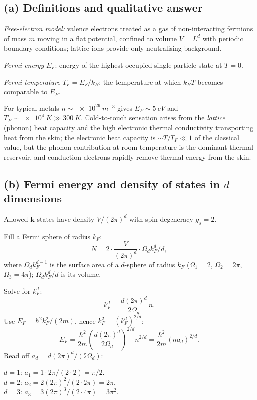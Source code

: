 \documentclass[11pt]{article}
\begin{document}
\subsection*{(a) Definitions and qualitative answer}

\emph{Free-electron model:} valence electrons treated as a gas of non-interacting fermions of mass $m$ moving in a flat potential, confined to volume $V=L^d$ with periodic boundary conditions; lattice ions provide only neutralising background.

\emph{Fermi energy} $E_F$: energy of the highest occupied single-particle state at $T=0$.

\emph{Fermi temperature} $T_F = E_F/k_B$: the temperature at which $k_B T$ becomes comparable to $E_F$.

For typical metals $n\sim\SI{e29}{m^{-3}}$ gives $E_F\sim\SI{5}{eV}$ and $T_F\sim\SI{e4}{K}\gg \SI{300}{K}$. Cold-to-touch sensation arises from the \emph{lattice} (phonon) heat capacity and the high electronic thermal conductivity transporting heat from the skin; the electronic heat capacity is $\sim T/T_F\ll 1$ of the classical value, but the phonon contribution at room temperature is the dominant thermal reservoir, and conduction electrons rapidly remove thermal energy from the skin.

\subsection*{(b) Fermi energy and density of states in $d$ dimensions}

Allowed $\bm k$ states have density $V/(2\pi)^d$ with spin-degeneracy $g_s=2$.

Fill a Fermi sphere of radius $k_F$:
\[
N = 2\cdot\frac{V}{(2\pi)^d}\cdot\Omega_d k_F^d / d,
\]
where $\Omega_d k_F^{d-1}$ is the surface area of a $d$-sphere of radius $k_F$ ($\Omega_1=2$, $\Omega_2=2\pi$, $\Omega_3=4\pi$); $\Omega_d k_F^d/d$ is its volume.

Solve for $k_F^d$:
\[
k_F^d = \frac{d(2\pi)^d}{2\Omega_d}\,n.
\]
Use $E_F = \hbar^2 k_F^2/(2m)$, hence $k_F^2 = (k_F^d)^{2/d}$:
\begin{equation}
\boxed{\;E_F = \frac{\hbar^2}{2m}\!\left(\frac{d(2\pi)^d}{2\Omega_d}\right)^{\!2/d}\!n^{2/d} = \frac{\hbar^2}{2m}(n a_d)^{2/d}.\;}
\end{equation}
Read off $a_d = d(2\pi)^d/(2\Omega_d)$:

\noindent
$d=1$: $a_1 = 1\cdot 2\pi /(2\cdot 2) = \pi/2$.\\
$d=2$: $a_2 = 2(2\pi)^2/(2\cdot 2\pi) = 2\pi$.\\
$d=3$: $a_3 = 3(2\pi)^3/(2\cdot 4\pi) = 3\pi^2$.
\end{document}

